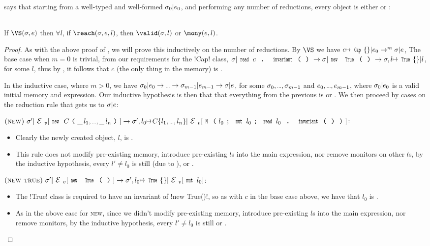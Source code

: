  says that starting from a well-typed and well-formed $\sigma_0|e_0$, and performing any number of reductions, every \reach object is either \valid or \mony:%
\SS\begin{theorem}\ \\
\indent If $\VS(\s, e)$ then $\forall l$, if $\reach(\s, e, l)$, then $\valid(\s, l)$ or $\mony(e, l)$.
\end{theorem}\SS
\begin{proof}
	As with the above proof of , we will prove this inductively on the number of reductions.
	By $\VS$ we have $c\mapsto\Kw{Cap}\{\}|e_0\rightarrow^{m} \s|e$, 
		The base case when $m = 0$ is trivial, 
			from our requirements for the \Q!Cap! class,
			$\s|\invariant{c} \rightarrow \s|\new{\Kw{True}}{} \rightarrow  \s,l\mapsto \Kw{True}\{\}|l$, for some $l$, thus by , it follows that $c$ (the only thing in the memory) is \valid.

	In the inductive case, where $m > 0$, we have $\drange[\rightarrow][0][m - 1]{\s}{\!|e} \rightarrow \s|e$, for some  $\range[,][0][m - 1]{\s}$ and $\range[,][0][m - 1]{e}$, where $\sigma_0|e_0$ is a valid initial memory and expression.
	Our inductive hypothesis is then that that everything \reach from the previous \VS is \valid or \mony. We then proceed by cases on the reduction rule that gets us to $\sigma|e$:
\begin{ienumerate}
	\item $\rrule{new}{\s'}{\new{C}{\range{\_\,l}}}{\s',l_0\mapsto C\{\range{l}\}}{\M{l_0}{\Kw{mut}\,l_0}{\invariant{l_0}}}$:
	\begin{itemize}
		\item Clearly the newly created object, $l$, is \mony.
		\item This rule does not modify pre-existing memory, introduce pre-existing $l$s into the main expression, nor remove monitors on other $l$s, by the inductive hypothesis, every $l' \neq l_0$ is still \valid (due to ), or \mony.
	\end{itemize}
	
	\item $\rrule{new true}{\s'}{\new{\Kw{True}}{}}{\s',l_0\mapsto \Kw{True}\{\}}{\Kw{mut}\,l_0}$:
	\begin{itemize}
		\item The \Q!True! class is required to have an invariant of \Q!new True()!,
		so as with $c$ in the base case above, we have that $l_0$ is \valid.
		\item As in the above case for \textsc{new}, since we didn't modify pre-existing memory, introduce pre-existing $l$s into the main expression, nor remove monitors, by the inductive hypothesis, every $l' \neq l_0$ is still \valid or \mony.
	\end{itemize}


\end{ienumerate}
\end{proof}
